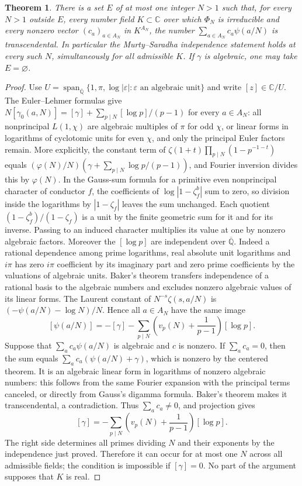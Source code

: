 \documentclass[11pt,a4paper,oneside,openany]{report}
\newtheorem{theorem}{Theorem}[section]
\theoremstyle{remark}\newtheorem{remark}[theorem]{Remark}
\numberwithin{equation}{section}
\begin{document}
\begin{theorem}\label{ch7:thm:digamma-single-denominator}
There is a set $E$ of at most one integer $N>1$ such that, for every
$N>1$ outside $E$, every number field $K\subset\mathbb C$ over which
$\Phi_N$ is irreducible and every nonzero vector $(c_a)_{a\in A_N}$
in $K^{A_N}$, the number $\sum_{a\in A_N}c_a\psi(a/N)$ is
transcendental. In particular the Murty--Saradha independence statement
holds at every such $N$, simultaneously for all admissible $K$.
If $\gamma$ is algebraic, one may take $E=\varnothing$.
\end{theorem}
\begin{proof}
Use $U=\operatorname{span}_{\overline{\mathbb Q}}
\{1,\pi,\log|\varepsilon|:\varepsilon\text{ an algebraic unit}\}$ and
write $[z]\in\mathbb C/U$. The Euler--Lehmer formulas \cite{lehm} give
$N[\gamma_0(a,N)]=[\gamma]+\sum_{p\mid N}[\log p]/(p-1)$ for every
$a\in A_N$: all nonprincipal $L(1,\chi)$ are algebraic multiples of
$\pi$ for odd $\chi$, or linear forms in logarithms of cyclotomic units
for even $\chi$, and only the principal Euler factors remain. More explicitly, the constant term of $\zeta(1+t)\prod_{p\mid N}(1-p^{-1-t})$ equals $(\varphi(N)/N)(\gamma+\sum_{p\mid N}\log p/(p-1))$, and Fourier inversion divides this by $\varphi(N)$. In the Gauss-sum formula for a primitive even nonprincipal character of conductor $f$, the coefficients of $\log|1-\zeta_f^b|$ sum to zero, so division inside the logarithms by $|1-\zeta_f|$ leaves the sum unchanged. Each quotient $(1-\zeta_f^b)/(1-\zeta_f)$ is a unit by the finite geometric sum for it and for its inverse. Passing to an induced character multiplies its value at one by nonzero algebraic factors. Moreover
the $[\log p]$ are independent over $\overline{\mathbb Q}$. Indeed a
rational dependence among prime logarithms, real absolute unit logarithms
and $i\pi$ has zero $i\pi$ coefficient by its imaginary part and zero
prime coefficients by the valuations of algebraic units. Baker's theorem
transfers independence of a rational basis to the algebraic numbers and
excludes nonzero algebraic values of its linear forms.
The Laurent constant of $N^{-s}\zeta(s,a/N)$ is
$(-\psi(a/N)-\log N)/N$. Hence all $a\in A_N$ have the same image
\[
 [\psi(a/N)]=-[\gamma]-\sum_{p\mid N}
       \left(v_p(N)+\frac1{p-1}\right)[\log p].
\]
Suppose that $\sum_a c_a\psi(a/N)$ is algebraic and $c$ is nonzero.
If $\sum_a c_a=0$, then the sum equals $\sum_a c_a(\psi(a/N)+\gamma)$,
which is nonzero by the centered theorem. It is an algebraic linear form
in logarithms of nonzero algebraic numbers: this follows from the same
Fourier expansion with the principal terms canceled, or directly from
Gauss's digamma formula. Baker's theorem makes it transcendental, a
contradiction. Thus $\sum_a c_a\ne0$, and projection gives
\[
 [\gamma]=-\sum_{p\mid N}
       \left(v_p(N)+\frac1{p-1}\right)[\log p].
\]
The right side determines all primes dividing $N$ and their exponents
by the independence just proved. Therefore it can occur for at most one
$N$ across all admissible fields; the condition is impossible if
$[\gamma]=0$. No part of the argument supposes that $K$ is real.
\end{proof}
\end{document}
